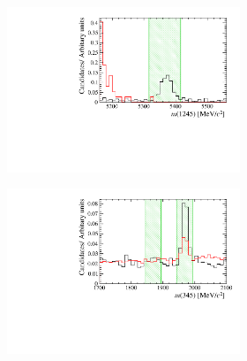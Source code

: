 \begin{figure}[!h]
   \centering
   \begin{subfigure}[t]{1.0\textwidth}
      \centering
      \begin{subfigure}[t]{0.32\textwidth}
         \includegraphics[width=1.0\textwidth]{figs/Selection/Veto_Comparison_B2DsPhi_Ds2KKPi_m1245.pdf}
      \end{subfigure}
      \begin{subfigure}[t]{0.32\textwidth}
         \includegraphics[width=1.0\textwidth]{figs/Selection/Veto_Comparison_B2DsPhi_Ds2KKPi_m345.pdf}
      \end{subfigure}
      \caption{\decay{\Bp}{(\decay{\Dsp}{\Kp\Km\pip})\phiz}}
   \end{subfigure}

\end{figure}
